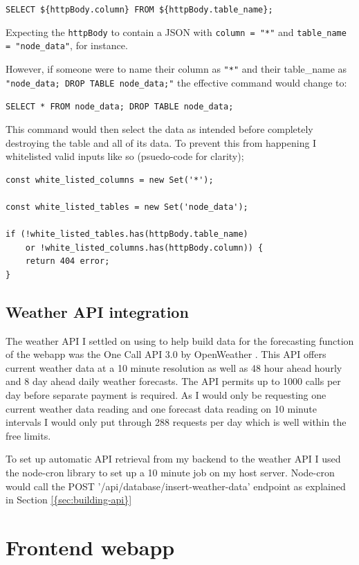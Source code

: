 \verb|SELECT ${httpBody.column} FROM ${httpBody.table_name};|

Expecting the \verb|httpBody| to contain a JSON with \texttt{column = "*"} and
\texttt{table\_name = "node\_data"}, for instance.

However, if someone were to name their column as \texttt{"*"} and their
table\_name as \texttt{"node\_data; DROP TABLE node\_data;"} the effective
command would change to:

\verb|SELECT * FROM node_data; DROP TABLE node_data;|

This command would then select the data as intended before completely destroying
the table and all of its data. To prevent this from happening I whitelisted
valid inputs like so (psuedo-code for clarity);

\begin{verbatim}
const white_listed_columns = new Set('*');

const white_listed_tables = new Set('node_data');

if (!white_listed_tables.has(httpBody.table_name) 
    or !white_listed_columns.has(httpBody.column)) {
    return 404 error;
}
\end{verbatim}

\subsection{Weather API integration}

The weather API I settled on using to help build data for the forecasting
function of the webapp was the One Call API 3.0 by OpenWeather
\cite{openweatherAPI}. This API offers current weather data at a 10 minute
resolution as well as 48 hour ahead hourly and 8 day ahead daily weather
forecasts. The API permits up to 1000 calls per day before separate payment is
required. As I would only be requesting one current weather data reading and one
forecast data reading on 10 minute intervals I would only put through 288
requests per day which is well within the free limits.

To set up automatic API retrieval from my backend to the weather API I used the
node-cron library \cite{node-cron} to set up a 10 minute job on my host server.
Node-cron would call the POST '/api/database/insert-weather-data' endpoint as
explained in Section \ref{{sec:building-api}}

\section{Frontend webapp}\label{sec:front-end}

